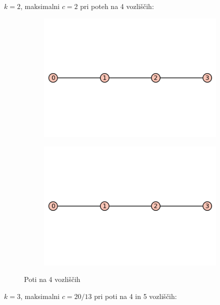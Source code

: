 \documentclass[12pt, a4paper]{article}
\begin{document}
$k=2$, maksimalni $c=2$ pri poteh na 4 vozliščih:\\

\begin{center}
\begin{figure}[!htb]
\centering
\begin{subfigure}{0.5\textwidth}
  \centering
  \includegraphics[width=0.4\linewidth]{4-pot}
\end{subfigure}%
\begin{subfigure}{0.5\textwidth}
  \centering
  \includegraphics[width=0.5\linewidth]{4-pot}
\end{subfigure}
\caption{Poti na 4 vozliščih}
\label{fig:test}
\end{figure}

\end{center}

$k=3$, maksimalni $c=20/13$ pri poti na 4 in 5 vozliščih:\\
\end{document}
